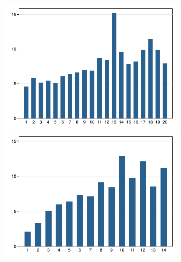 \documentclass[11pt,letterpaper]{article}
\begin{document}
\begin{figure}[H]
\begin{subfigure}[b]{0.33\linewidth}
		\vspace{-2.5em}
		\newline {}
		\includegraphics[width=1\linewidth]{../../empirical/CSES2017/Appendix/Graphs/cons_educhead} 
		\vspace{-2.5em}
		\newline {}
		\includegraphics[width=1\linewidth]{../../empirical/CSES2017/Appendix/Graphs/cons_nmember} 
		\vspace{-2.5em}
		\newline {}

\end{subfigure}
\end{figure}
\end{document}
